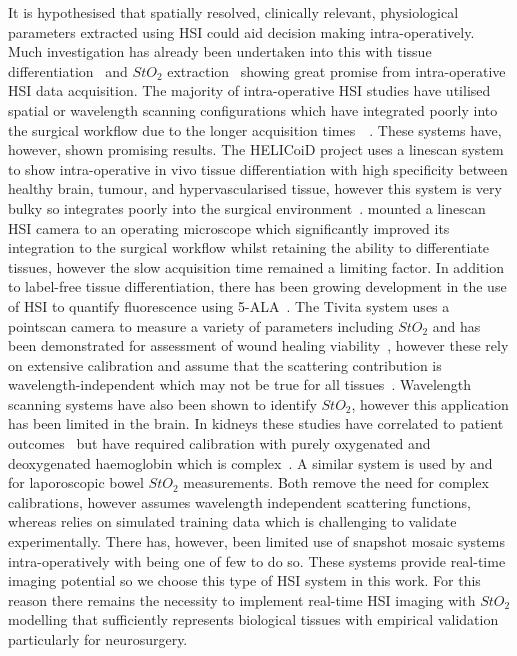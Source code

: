 It is hypothesised that spatially resolved, clinically relevant, physiological parameters extracted using HSI could aid decision making intra-operatively. Much investigation has already been undertaken into this with tissue differentiation~\citep{Kabwama2016, Fabelo2019, Kho2019, Giannantonio2023} and $StO_2$ extraction~\citep{Yudovsky2015, Clancy2015, WOS:000360241100026, Wirkert2016, Clancy2020, Thoenissen2023} showing great promise from intra-operative HSI data acquisition. The majority of intra-operative HSI studies have utilised spatial or wavelength scanning configurations which have integrated poorly into the surgical workflow due to the longer acquisition times~~\citep{Shapey2019, MacCormac2023, Fabelo2019}. These systems have, however, shown promising results. The HELICoiD project uses a linescan system to show intra-operative in vivo tissue differentiation with high specificity between healthy brain, tumour, and hypervascularised tissue, however this system is very bulky so integrates poorly into the surgical environment~\citep{Fabelo2019, Fabelo2019a, Kabwama2016}. \citet{Giannantonio2023} mounted a linescan HSI camera to an operating microscope which significantly improved its integration to the surgical workflow whilst retaining the ability to differentiate tissues, however the slow acquisition time remained a limiting factor. In addition to label-free tissue differentiation, there has been growing development in the use of HSI to quantify fluorescence using 5-ALA~\citep{Walke2023}. The Tivita system uses a pointscan camera to measure a variety of parameters including $StO_2$ and has been demonstrated for assessment of wound healing viability~\citep{Thoenissen2023}, however these rely on extensive calibration and assume that the scattering contribution is wavelength-independent which may not be true for all tissues~\citep{Holmer2018, Jacques2013}. Wavelength scanning systems have also been shown to identify $StO_2$, however this application has been limited in the brain. In kidneys these studies have correlated to patient outcomes~\citep{Liu2013} but have required calibration with purely oxygenated and deoxygenated haemoglobin which is complex~\citep{Zuzak2002}. A similar system is used by \citet{Clancy2015} and \citet{Wirkert2016} for laporoscopic bowel $StO_2$ measurements. Both remove the need for complex calibrations, however \citet{Clancy2015} assumes wavelength independent scattering functions, whereas \citet{Wirkert2016} relies on simulated training data which is challenging to validate experimentally. There has, however, been limited use of snapshot mosaic systems intra-operatively with \citet{Pichette2016} being one of few to do so. These systems provide real-time imaging potential so we choose this type of HSI system in this work. For this reason there remains the necessity to implement real-time HSI imaging with $StO_2$ modelling that sufficiently represents biological tissues with empirical validation particularly for neurosurgery. 

